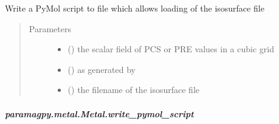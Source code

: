 \documentclass[a4paper,10pt,english,openany,oneside]{sphinxmanual}
\begin{document}
\begin{fulllineitems}
\begin{fulllineitems}
\begin{fulllineitems}
\label{\detokenize{reference/generated/paramagpy.metal.Metal.write_isomap:paramagpy.metal.Metal.write_isomap}}
Write a PyMol script to file which allows loading of the
isosurface file
\begin{quote}\begin{description}
\item[{Parameters}] \leavevmode\begin{itemize}
\item {} 
 () \textendash{} the scalar field of PCS or PRE values in a cubic grid

\item {} 
 (\sphinxstyleliteralemphasis{\sphinxupquote{ (}}\sphinxstyleliteralemphasis{\sphinxupquote{, }}\sphinxstyleliteralemphasis{\sphinxupquote{, }}\sphinxstyleliteralemphasis{\sphinxupquote{, }}\sphinxstyleliteralemphasis{\sphinxupquote{)}}) \textendash{} as generated by {\hyperref[\detokenize{reference/generated/paramagpy.metal.Metal.make_mesh:paramagpy.metal.Metal.make_mesh}]{}}

\item {} 
 (\sphinxstyleliteralemphasis{\sphinxupquote{ (}}\sphinxstyleliteralemphasis{\sphinxupquote{)}}) \textendash{} the filename of the isosurface file

\end{itemize}

\end{description}\end{quote}

\end{fulllineitems}



\subparagraph{paramagpy.metal.Metal.write\_pymol\_script}
\label{\detokenize{reference/generated/paramagpy.metal.Metal.write_pymol_script:paramagpy-metal-metal-write-pymol-script}}\label{\detokenize{reference/generated/paramagpy.metal.Metal.write_pymol_script::doc}}


\end{fulllineitems}
\end{fulllineitems}
\end{document}
